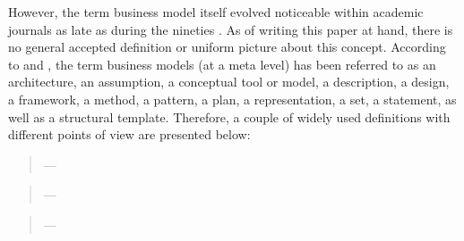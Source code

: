 However, the term business model itself evolved noticeable within academic journals as late as during the nineties . As of writing this paper at hand, there is no general accepted definition or uniform picture about this concept. According to \citet[p. 726]{Morris2005} and \citet[p. 1022]{Zott2011}, the term business models (at a meta level) has been referred to as an architecture, an assumption, a conceptual tool or model, a description, a design, a framework, a method, a pattern, a plan, a representation, a set, a statement, as well as a structural template. Therefore, a couple of widely used definitions with different points of view are presented below:
	
\begin{quotation}\vspace*{-5pt}{\slshape 
[A business model is] an architecture for the product, service and information flows, including a description of the various business actors and their roles; and a description of the potential benefits for the various business actors; and a description of the sources of revenues.}
\vspace*{-7pt}
\begin{flushright}
	--- \citealp[p. 2]{Timmers1998}
\end{flushright}
\end{quotation}

\begin{quotation}\vspace*{-5pt}{\slshape 
Business models are defined as summary of the value creation logic of an organization or a business network including assumptions about its partners, competitors and customers. They define the business and IS architecture, rules, potential benefits and the sources of revenue.}
\vspace*{-7pt}
\begin{flushright}
	--- \citealp[p. 798]{Klueber2000}
\end{flushright}
\end{quotation}

\begin{quotation}\vspace*{-5pt}{\slshape 
A business model depicts the content, structure, and governance of transactions designed so as to create value through the exploitation of business opportunities.}
\vspace*{-7pt}
\begin{flushright}
	--- \citealp[p. 511]{Amit2001}
\end{flushright}
\end{quotation}


